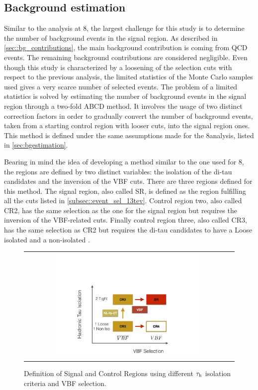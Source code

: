 \subsection{Background estimation}

Similar to the analysis at 8\tev, the largest challenge for this study is to determine the number of background events in the signal region. As described in \autoref{sec::bg_contributions}, the main background contribution is coming from QCD events. The remaining background contributions are considered negligible. Even though this study is characterized by a loosening of the selection cuts with respect to the previous analysis, the limited statistics of the Monte Carlo samples used gives a very scarce number of selected events. The problem of a limited statistics is solved by estimating the number of background events in the signal region through a two-fold ABCD method. It involves the usage of two distinct correction factors in order to gradually convert the number of background events, taken from a starting control region with looser cuts, into the signal region ones. This method is defined under the same assumptions made for the 8\tev analysis, listed in \autoref{sec:bgestimation}.

Bearing in mind the idea of developing a method similar to the one used for 8\tev, the regions are defined by two distinct variables: the isolation of the di-tau candidates and the inversion of the VBF cuts. There are three regions defined for this method. The signal region, also called SR, is defined as the region fulfilling all the cuts listed in \autoref{subsec::event_sel_13tev}. Control region two, also called CR2, has the same selection as the one for the signal region but requires the inversion of the VBF-related cuts. Finally control region three, also called CR3, has the same selection as CR2 but requires the di-tau candidates to have a Loose isolated and a non-isolated \hadtau.

\begin{figure}[tbh!]
	\centering
	\begin{tabular}{cc}
		\includegraphics[width=0.75\textwidth]{PLOTS/diTauHadLSotherPlots/controlregions13TeV.pdf}
	\end{tabular}
	\caption{Definition of Signal and Control Regions using different $\tau_{\text{h}}$ isolation criteria and VBF selection.}
	\label{fig:crs_13tev}
\end{figure}

